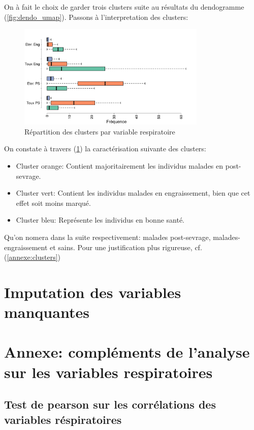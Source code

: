 \documentclass{article}
\begin{document}
On à fait le choix de garder trois clusters suite au résultats du dendogramme (\ref{fig:dendo_umap}). Passons à l'interpretation des clusters:

\begin{figure}[h]
    \centering
    \includegraphics[width=0.8\textwidth]{img_var_resp/rep_cluster_var_orig.png}
    \caption{Répartition des clusters par variable respiratoire}\label{fig:rep_cluster_respi}
\end{figure}
On constate à travers (\ref{fig:rep_cluster_respi}) la caractérisation suivante des clusters:
\begin{itemize}
    \item Cluster orange: Contient majoritairement les individus malades en post-sevrage.
    \item Cluster vert: Contient les individus malades en engraissement, bien que cet effet soit moins marqué.
    \item Cluster bleu: Représente les individus en bonne santé.
\end{itemize}
Qu'on nomera dans la suite respectivement: malades post-sevrage, malades-engraissement et sains. Pour une justification plus rigureuse, cf. (\ref{annexe:clusters})
\newpage

\section{Imputation des variables manquantes}

\newpage
\appendix

\section{Annexe: compléments de l'analyse sur les variables respiratoires}
\subsection{Test de pearson sur les corrélations des variables réspiratoires}\label{annexe:pearson}
\end{document}
